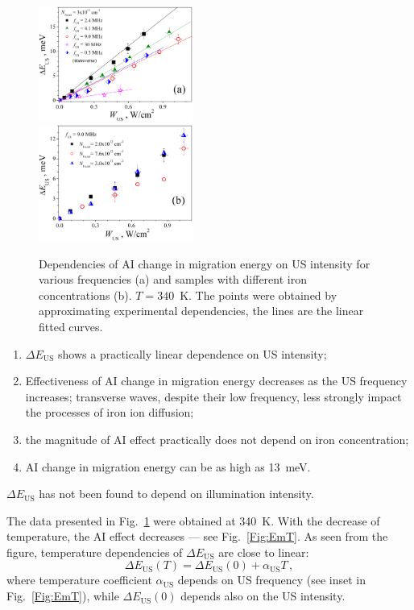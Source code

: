 \documentclass[%
 aip,jap,
 amsmath,amssymb,
 reprint,%
]{revtex4-1}
\begin{document}
\begin{figure}
\includegraphics[width=0.45\textwidth]{Fig6a}\\%
\includegraphics[width=0.45\textwidth]{Fig6b}%
\caption{\label{Fig:EmWus}
Dependencies of AI change in migration energy on US intensity for various
frequencies (a) and samples with different  iron concentrations (b).
$T=340$~K.
The points were obtained by approximating experimental dependencies,
the lines are the linear fitted curves.
}
\end{figure}


\begin{enumerate}
  \item $\Delta E_\mathrm{US}$ shows a practically linear dependence on US intensity;
  \item Effectiveness of AI change in migration energy decreases as the US frequency increases; transverse waves, despite their low frequency, less strongly impact the processes of iron ion diffusion;
  \item the magnitude of AI effect practically does not depend on iron concentration;
  \item AI change in migration energy can be as high as 13~meV.
\end{enumerate}

$\Delta E_\mathrm{US}$ has not been found to depend on illumination intensity.

The data presented in Fig.~\ref{Fig:EmWus} were obtained at 340~K.
With the decrease of temperature, the AI effect  decreases –-- see Fig.~\ref{Fig:EmT}.
As seen from the figure, temperature dependencies of $\Delta E_\mathrm{US}$ are close to linear:
\begin{equation}
\label{eqEmT}
\Delta E_\mathrm{US}(T)=\Delta E_\mathrm{US}(0)+\alpha_\mathrm{US}T\,,
\end{equation}
where temperature coefficient $\alpha_\mathrm{US}$ depends on US frequency
(see inset in Fig.~\ref{Fig:EmT}), while $\Delta E_\mathrm{US}(0)$ depends also on the US intensity.
\end{document}
